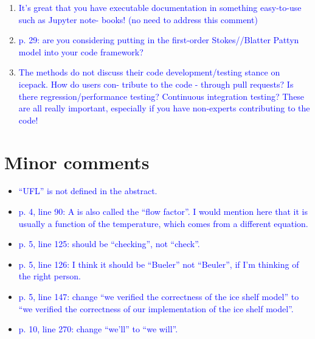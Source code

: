 \documentclass{article}
\theoremstyle{definition}
\theoremstyle{plain}
\begin{document}
\begin{enumerate}
{for the symbolic representation?}
\item \textcolor{blue}{It’s great that you have executable documentation in something easy-to-use such as Jupyter note-
books! (no need to address this comment)}
\item \textcolor{blue}{p. 29: are you considering putting in the first-order Stokes//Blatter Pattyn model into your code
framework?}
\item \textcolor{blue}{The methods do not discuss their code development/testing stance on icepack. How do users con-
tribute to the code - through pull requests? Is there regression/performance testing? Continuous
integration testing? These are all really important, especially if you have non-experts contributing
to the code!}
\end{enumerate}

\section*{Minor comments}

\begin{itemize}
\item \textcolor{blue}{“UFL” is not defined in the abstract.}
\item \textcolor{blue}{p. 4, line 90: A is also called the “flow factor”. I would mention here that it is usually a function of
the temperature, which comes from a different equation.}
\item \textcolor{blue}{p. 5, line 125: should be “checking”, not “check”.}
\item \textcolor{blue}{p. 5, line 126: I think it should be “Bueler” not “Beuler”, if I’m thinking of the right person.}
\item \textcolor{blue}{p. 5, line 147: change “we verified the correctness of the ice shelf model” to “we verified the correctness
of our implementation of the ice shelf model”.}
\item \textcolor{blue}{p. 10, line 270: change “we’ll” to “we will”.}
\end{itemize}
\end{document}
